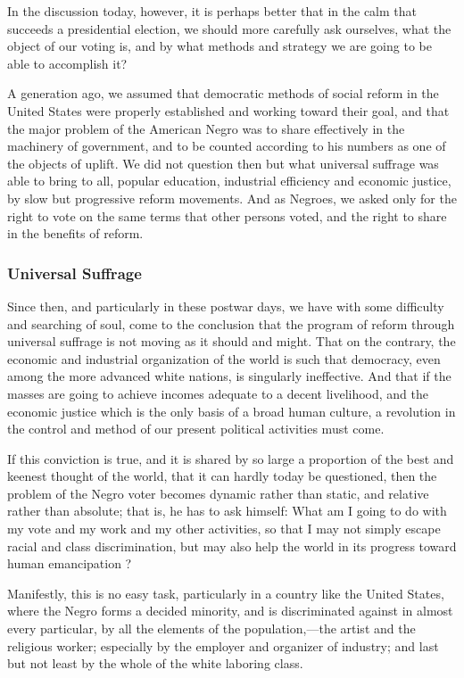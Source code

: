 \documentclass[letterpaper,10pt,english]{jupyterBook}
\begin{document}
\sphinxAtStartPar
In the discussion today, however, it is perhaps better that in the calm that succeeds a presidential election, we should more carefully ask ourselves, what the object of our voting is, and by what methods and strategy we are going to be able to accomplish it?

\sphinxAtStartPar
A generation ago, we assumed that democratic methods of social reform in the United States were properly established and working toward their goal, and that the major problem of the American Negro was to share effectively in the machinery of government, and to be counted according to his numbers as one of the objects of uplift. We did not question then but what universal suffrage was able to bring to all, popular education, industrial efficiency and economic justice, by slow but progressive reform movements. And as Negroes, we asked only for the right to vote on the same terms that other persons voted, and the right to share in the benefits of reform.


\subsubsection{Universal Suffrage}
\label{\detokenize{Volumes/40/06/strategy_of_the_negro_voter:universal-suffrage}}
\sphinxAtStartPar
Since then, and particularly in these post\sphinxhyphen{}war days, we have with some difficulty and searching of soul, come to the conclusion that the program of reform through universal suffrage is not moving as it should and might. That on the contrary, the economic and industrial organization of the world is such that democracy, even among the more advanced white nations, is singularly ineffective. And that if the masses are going to achieve incomes adequate to a decent livelihood, and the economic justice which is the only basis of a broad human culture, a revolution in the control and method of our present political activities must come.

\sphinxAtStartPar
If this conviction is true, and it is shared by so large a proportion of the best and keenest thought of the world, that it can hardly today be questioned, then the problem of the Negro voter becomes dynamic rather than static, and relative rather than absolute; that is, he has to ask himself: What am I going to do with my vote and my work and my other activities, so that I may not simply escape racial and class discrimination, but may also help the world in its progress toward human emancipation ?

\sphinxAtStartPar
Manifestly, this is no easy task, particularly in a country like the United States, where the Negro forms a decided minority, and is discriminated against in almost every particular, by all  the elements of the population,—the artist and the religious worker; especially by the employer and organizer of industry; and last but not least by the whole of the white laboring class.
\end{document}
